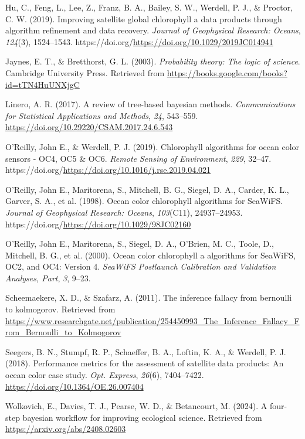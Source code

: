 \documentclass[
]{agujournal2019}
\newlength{\cslhangindent}
\newenvironment{CSLReferences}[2] %
 {\begin{list}{}{%
  \setlength{\itemindent}{0pt}
  \setlength{\leftmargin}{0pt}
  \setlength{\parsep}{0pt}
  \ifodd #1
   \setlength{\leftmargin}{\cslhangindent}
   \setlength{\itemindent}{-1\cslhangindent}
  \fi
  \setlength{\itemsep}{#2\baselineskip}}}
 {\end{list}}
\begin{document}
\begin{CSLReferences}{1}{0}
Hu, C., Feng, L., Lee, Z., Franz, B. A., Bailey, S. W., Werdell, P. J.,
\& Proctor, C. W. (2019). Improving satellite global chlorophyll a data
products through algorithm refinement and data recovery. \emph{Journal
of Geophysical Research: Oceans}, \emph{124}(3), 1524--1543.
https://doi.org/\url{https://doi.org/10.1029/2019JC014941}

Jaynes, E. T., \& Bretthorst, G. L. (2003). \emph{Probability theory:
The logic of science}. Cambridge University Press. Retrieved from
\url{https://books.google.com/books?id=tTN4HuUNXjgC}

Linero, A. R. (2017). A review of tree-based bayesian methods.
\emph{Communications for Statistical Applications and Methods},
\emph{24}, 543--559. \url{https://doi.org/10.29220/CSAM.2017.24.6.543}

O'Reilly, John E., \& Werdell, P. J. (2019). Chlorophyll algorithms for
ocean color sensors - OC4, OC5 \& OC6. \emph{Remote Sensing of
Environment}, \emph{229}, 32--47.
https://doi.org/\url{https://doi.org/10.1016/j.rse.2019.04.021}

O'Reilly, John E., Maritorena, S., Mitchell, B. G., Siegel, D. A.,
Carder, K. L., Garver, S. A., et al. (1998). Ocean color chlorophyll
algorithms for SeaWiFS. \emph{Journal of Geophysical Research: Oceans},
\emph{103}(C11), 24937--24953.
https://doi.org/\url{https://doi.org/10.1029/98JC02160}

O'Reilly, John E., Maritorena, S., Siegel, D. A., O'Brien, M. C., Toole,
D., Mitchell, B. G., et al. (2000). Ocean color chlorophyll a algorithms
for SeaWiFS, OC2, and OC4: Version 4. \emph{SeaWiFS Postlaunch
Calibration and Validation Analyses, Part}, \emph{3}, 9--23.

Scheemaekere, X. D., \& Szafarz, A. (2011). The inference fallacy from
bernoulli to kolmogorov. Retrieved from
\url{https://www.researchgate.net/publication/254450993_The_Inference_Fallacy_From_Bernoulli_to_Kolmogorov}

Seegers, B. N., Stumpf, R. P., Schaeffer, B. A., Loftin, K. A., \&
Werdell, P. J. (2018). Performance metrics for the assessment of
satellite data products: An ocean color case study. \emph{Opt. Express},
\emph{26}(6), 7404--7422. \url{https://doi.org/10.1364/OE.26.007404}

Wolkovich, E., Davies, T. J., Pearse, W. D., \& Betancourt, M. (2024). A
four-step bayesian workflow for improving ecological science. Retrieved
from \url{https://arxiv.org/abs/2408.02603}

\end{CSLReferences}
\end{document}
